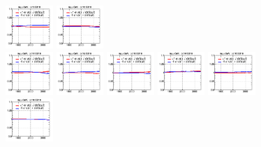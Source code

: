 \begin{figure}[!htbp]
{{\includegraphics[width=0.16\textwidth]{fig/spectra__pdf9_BB18_ADDGRW.png}
\includegraphics[width=0.16\textwidth]{fig/spectra__pdf10_BB18_ADDGRW.png}\\
\includegraphics[width=0.16\textwidth]{fig/spectra__pdf11_BB18_ADDGRW.png}
\includegraphics[width=0.16\textwidth]{fig/spectra__pdf12_BB18_ADDGRW.png}
\includegraphics[width=0.16\textwidth]{fig/spectra__pdf13_BB18_ADDGRW.png}
\includegraphics[width=0.16\textwidth]{fig/spectra__pdf14_BB18_ADDGRW.png}
\includegraphics[width=0.16\textwidth]{fig/spectra__pdf15_BB18_ADDGRW.png}\\
\includegraphics[width=0.16\textwidth]{fig/spectra__pdf16_BB18_ADDGRW.png}
}}
\end{figure}
